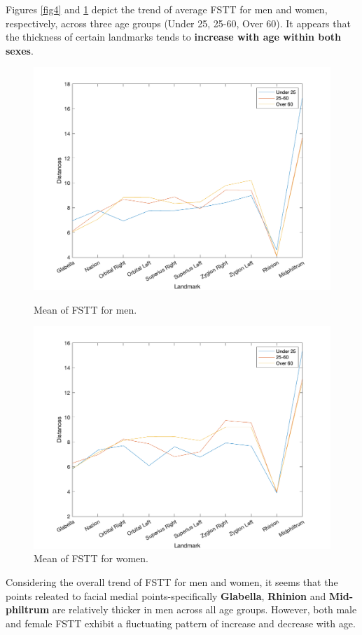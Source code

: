\documentclass[journal,article,submit,pdftex,moreauthors]{Definitions/mdpi}
\begin{document}
\noindent Figures \ref{fig4} and \ref{fig5} depict the trend of average FSTT for men and women, respectively, across three age groups (Under 25, 25-60, Over 60). It appears that the thickness of certain landmarks tends to \textbf{increase with age within both sexes}.

\begin{figure}[H]
\begin{minipage}{0.52\textwidth}
\centering
\includegraphics[width=1\linewidth]{Definitions/Men_distances_after_cleaning.png}
\caption{Mean of FSTT for men.}
\label{fig4}
\end{minipage}%
\begin{minipage}{0.52\textwidth}
\centering
\includegraphics[width=1\linewidth]{Definitions/Women_distances_after_cleaning.png}
\caption{Mean of FSTT for women.}
\label{fig5}
\end{minipage}
\end{figure}
\noindent Considering the overall trend of FSTT for men and women, it seems that the points releated to facial medial points-specifically \textbf{Glabella}, \textbf{Rhinion} and \textbf{Mid-philtrum} are relatively thicker in men across all age groups. However, both male and female FSTT exhibit a fluctuating pattern of increase and decrease with age.
\end{document}
